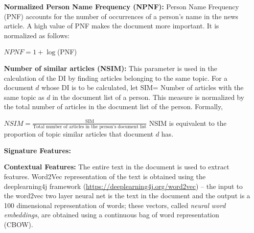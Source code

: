\documentclass[a4paper,man,natbib]{apa6}
\begin{document}

\noindent \textbf{ Normalized Person Name Frequency (NPNF): }
Person Name Frequency (PNF) accounts for the number of occurrences of a person's name in the news article. A high value of PNF makes the document more important. It is normalized as follows:

\begin{center}
$NPNF=	1+\log$(PNF)
\end{center}

\noindent \textbf{Number of similar articles (NSIM): }
This parameter is used in the calculation of the DI by finding articles belonging to the same topic. 
For a document $d$ whose DI is to be calculated, let  SIM= Number of articles with the same topic as $d$ in the document list of a person.
This measure is normalized by the total number of articles in the document list of the person. Formally,

$NSIM= \frac{\text{SIM}} {\text{Total number of articles in the person's document list}}$
NSIM is equivalent to the proportion of topic similar articles that document $d$ has.

\noindent \textbf{Signature Features: } %


\noindent \textbf{Contextual Features: } The entire text in the document is used to extract features. Word2Vec representation \cite{Mikolov_13a, Mikolov_13b} of the text is obtained using the deeplearning4j framework (\url{https://deeplearning4j.org/word2vec}) -- the input to the word2vec two layer neural net is the text in the document and the output is a 100 dimensional representation of words; these vectors, called \emph{neural word embeddings}, are obtained using a continuous bag of word representation (CBOW). 
\end{document}
